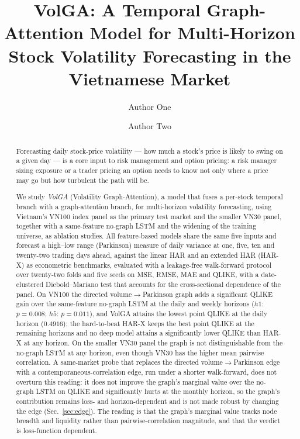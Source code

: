 \documentclass[runningheads]{llncs}
\begin{document}
\title{VolGA: A Temporal Graph-Attention Model for Multi-Horizon Stock Volatility Forecasting in the Vietnamese Market}

\author{Author One \and Author Two}

\maketitle

\begin{abstract}
Forecasting daily stock-price volatility --- how much a stock's price is likely to swing on a given
day --- is a core input to risk management and option pricing: a risk manager sizing exposure or a
trader pricing an option needs to know not only where a price may go but how turbulent the path will
be.

We study \emph{VolGA} (Volatility Graph-Attention), a model that fuses a per-stock temporal branch
with a graph-attention branch, for multi-horizon volatility forecasting, using Vietnam's VN100 index
panel as the primary test market and the smaller VN30 panel, together with a same-feature no-graph
LSTM and the widening of the training universe, as ablation studies. All feature-based models share
the same five inputs and forecast a high--low range (Parkinson) measure of daily variance at one,
five, ten and twenty-two trading days ahead, against the linear HAR and an extended HAR (HAR-X) as
econometric benchmarks, evaluated with a leakage-free walk-forward protocol over twenty-two folds and
five seeds on MSE, RMSE, MAE and QLIKE, with a date-clustered Diebold--Mariano test that accounts for
the cross-sectional dependence of the panel. On VN100 the directed volume$\to$Parkinson graph adds a
significant QLIKE gain over the same-feature no-graph LSTM at the daily and weekly horizons
($h1$: $p=0.008$; $h5$: $p=0.011$), and VolGA attains the lowest point QLIKE at the daily horizon
($0.4916$); the hard-to-beat HAR-X keeps the best point QLIKE at the remaining horizons and no deep
model attains a significantly lower QLIKE than HAR-X at any horizon. On the smaller VN30 panel the
graph is not distinguishable from the no-graph LSTM at any horizon, even though VN30 has the higher
mean pairwise correlation. A same-market probe that replaces the directed volume$\to$Parkinson edge
with a contemporaneous-correlation edge, run under a shorter walk-forward, does not overturn this
reading: it does not improve the graph's marginal value over the no-graph LSTM on QLIKE and
significantly hurts at the monthly horizon, so the graph's contribution remains loss- and
horizon-dependent and is not made robust by changing the edge (Sec.~\ref{sec:edge}). The reading is
that the graph's marginal value tracks node breadth and liquidity rather than pairwise-correlation
magnitude, and that the verdict is loss-function dependent.
\end{abstract}
\end{document}
